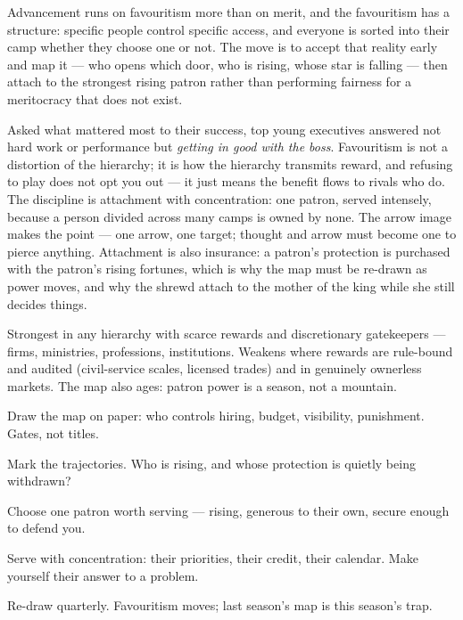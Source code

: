 \begin{core}
Advancement runs on favouritism more than on merit, and the favouritism has a structure: specific people control specific access, and everyone is sorted into their camp whether they choose one or not. The move is to accept that reality early and map it --- who opens which door, who is rising, whose star is falling --- then attach to the strongest rising patron rather than performing fairness for a meritocracy that does not exist.
\end{core}
\begin{mechanism}
Asked what mattered most to their success, top young executives answered not hard work or performance but \emph{getting in good with the boss}. Favouritism is not a distortion of the hierarchy; it is how the hierarchy transmits reward, and refusing to play does not opt you out --- it just means the benefit flows to rivals who do. The discipline is attachment with concentration: one patron, served intensely, because a person divided across many camps is owned by none. The arrow image makes the point --- one arrow, one target; thought and arrow must become one to pierce anything. Attachment is also insurance: a patron's protection is purchased with the patron's rising fortunes, which is why the map must be re-drawn as power moves, and why the shrewd attach to the mother of the king while she still decides things.
\end{mechanism}
\begin{conditions}
Strongest in any hierarchy with scarce rewards and discretionary gatekeepers --- firms, ministries, professions, institutions. Weakens where rewards are rule-bound and audited (civil-service scales, licensed trades) and in genuinely ownerless markets. The map also ages: patron power is a season, not a mountain.
\end{conditions}
\begin{application}
  \item Draw the map on paper: who controls hiring, budget, visibility, punishment. Gates, not titles.
  \item Mark the trajectories. Who is rising, and whose protection is quietly being withdrawn?
  \item Choose one patron worth serving --- rising, generous to their own, secure enough to defend you.
  \item Serve with concentration: their priorities, their credit, their calendar. Make yourself their answer to a problem.
  \item Re-draw quarterly. Favouritism moves; last season's map is this season's trap.
\end{application}
